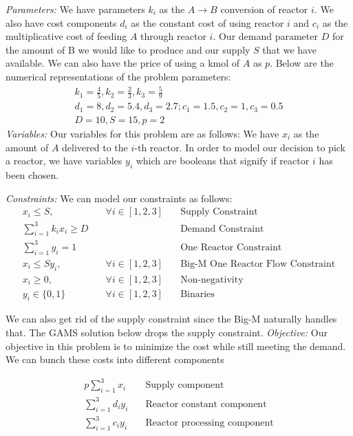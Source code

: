 \documentclass[11pt]{article}
\begin{document}
\textit{Parameters:} 
We have parameters $k_i$ as the $A \rightarrow B$ conversion of reactor $i$.
We also have cost components $d_i$ as the constant cost of using reactor $i$ and $c_i$ as the multiplicative cost of feeding $A$ through reactor $i$.
Our demand parameter $D$ for the amount of B we would like to produce and our supply $S$ that we have available.
We can also have the price of using a kmol of $A$ as $p$.
Below are the numerical representations of the problem parameters:
\begin{align*}
  k_1=\frac{4}{5}, k_2=\frac{2}{3}, k_3=\frac{5}{9} \\
  d_1=8, d_2=5.4, d_3=2.7; c_1=1.5, c_2=1, c_3=0.5 \\
  D = 10, S=15, p=2
\end{align*}
\textit{Variables:}
Our variables for this problem are as follows:
We have $x_{i}$ as the amount of $A$ delivered to the $i$-th reactor.
In order to model our decision to pick a reactor, we have variables $y_i$ which are booleans that signify if reactor $i$ has been chosen.

\textit{Constraints:}
We can model our constraints as follows:
\begin{align*}
  x_i \leq S, & \quad \forall i \in [1,2,3] & \quad \text{Supply Constraint} \\
  \sum_{i=1}^{3} k_i x_i \geq D & \quad & \quad \text{Demand Constraint} \\
  \sum_{i=1}^{3} y_i = 1 & \quad & \quad \text{One Reactor Constraint} \\
  x_i \leq S y_i, & \quad \forall i \in [1,2,3] & \quad \text{Big-M One Reactor Flow Constraint} \\
  x_i \geq 0, & \quad \forall i \in [1,2,3] & \quad \text{Non-negativity} \\
  y_i \in \{ 0,1 \}  & \quad \forall i \in [1,2,3] & \quad \text{Binaries}
\end{align*}

We can also get rid of the supply constraint since the Big-M naturally handles that.
The GAMS solution below drops the supply constraint.
\textit{Objective:}
Our objective in this problem is to minimize the cost while still meeting the demand.
We can bunch these costs into different components

\begin{align*}
  p\sum_{i=1}^{3}x_i  & \quad \text{Supply component} \\
  \sum_{i=1}^{3}d_i y_i & \quad \text{Reactor constant component} \\
  \sum_{i=1}^{3}c_i y_i & \quad \text{Reactor processing component} \\
\end{align*}
\end{document}
